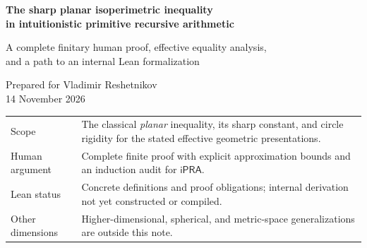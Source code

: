 \documentclass[11pt,a4paper]{article}
\theoremstyle{definition}
\newcommand{\ipra}{\mathsf{iPRA}}
\newcommand{\N}{\mathbb N}
\newcommand{\Area}{\mathcal A}
\begin{document}
\begin{titlepage}
\vspace*{12mm}
{\Large\bfseries The sharp planar isoperimetric inequality\\[3mm]
in intuitionistic primitive recursive arithmetic\par}
\vspace{8mm}
{\large A complete finitary human proof, effective equality analysis,\\
and a path to an internal Lean formalization\par}
\vspace{10mm}
Prepared for Vladimir Reshetnikov\\
14 November 2026
\vspace{10mm}
\begin{abstract}
We give an arithmetic proof of the classical planar inequality
\(L^2\ge4\pi A\). Its uniform finite core is a theorem about rational
polygons: if \(u_i\) are certified rational upper bounds on the side
lengths, \(S=\sum_i u_i\), and \(k\in\N\), then
\[
 4\pi_k\,|\Area(P)|\le S^2+2^{-k}.
\]
The numbers \(\pi_k\) are explicitly defined rationals satisfying
\(0\le\pi-\pi_k<2^{-k}\). The proof uses finite Fourier sums on
dyadic regular polygons, positive quadratic radicals, and a bounded
rational subdivision. All analytic limiting language is replaced by
precision estimates.

The finite theorem extends to polygonally presented rectifiable
boundaries. A lower-real formulation of perimeter avoids assuming that
the length of a computable curve is computable. An explicit Fourier
stability estimate proves that equality forces the boundary to be a
circle; its center and radius are extracted without compactness or a
choice of subsequence.

The formalization target is an actual derivation in ProveIt's embedded
intuitionistic PRA, not merely a Lean theorem about real numbers.
The included Lean files specify the finite data, numerical coding,
and internal target. They are an uncompiled blueprint, not a completed
machine-checked proof.
\end{abstract}
\vfill
\begin{tabular}{@{}p{}p{}@{}}
\toprule
Scope & The classical \emph{planar} inequality, its sharp constant,
and circle rigidity for the stated effective geometric presentations.\\
Human argument & Complete finite proof with explicit approximation
bounds and an induction audit for \(\ipra\).\\
Lean status & Concrete definitions and proof obligations; internal
derivation not yet constructed or compiled.\\
Other dimensions & Higher-dimensional, spherical, and metric-space
generalizations are outside this note.\\
\bottomrule
\end{tabular}
\end{titlepage}
\setcounter{tocdepth}{1}
\tableofcontents
\newpage
\end{document}
